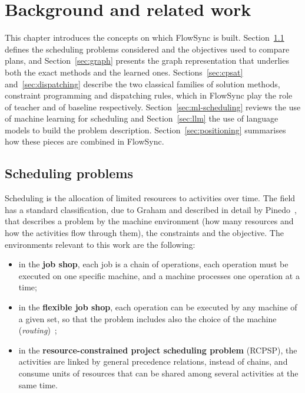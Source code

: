\chapter{Background and related work}
\label{chap:background}

This chapter introduces the concepts on which FlowSync is built. Section~\ref{sec:scheduling}
defines the scheduling problems considered and the objectives used to compare plans, and
Section~\ref{sec:graph} presents the graph representation that underlies both the exact methods
and the learned ones. Sections~\ref{sec:cpsat} and~\ref{sec:dispatching} describe the two
classical families of solution methods, constraint programming and dispatching rules, which in
FlowSync play the role of teacher and of baseline respectively. Section~\ref{sec:ml-scheduling}
reviews the use of machine learning for scheduling and Section~\ref{sec:llm} the use of language
models to build the problem description. Section~\ref{sec:positioning} summarises how these
pieces are combined in FlowSync.


\section{Scheduling problems}
\label{sec:scheduling}

Scheduling is the allocation of limited resources to activities over time. The field has a
standard classification, due to Graham and described in detail by Pinedo~\cite{pinedo2022}, that
describes a problem by the machine environment (how many resources and how the activities flow
through them), the constraints and the objective. The environments relevant to this work are
the following:

\begin{itemize}
  \item in the \textbf{job shop}, each job is a chain of operations, each operation must be
        executed on one specific machine, and a machine processes one operation at a time;
  \item in the \textbf{flexible job shop}, each operation can be executed by any machine of a
        given set, so that the problem includes also the choice of the machine
        (\emph{routing})~\cite{brandimarte1993};
  \item in the \textbf{resource-constrained project scheduling problem} (RCPSP), the activities
        are linked by general precedence relations, instead of chains, and consume units of
        resources that can be shared among several activities at the same time.
\end{itemize}


